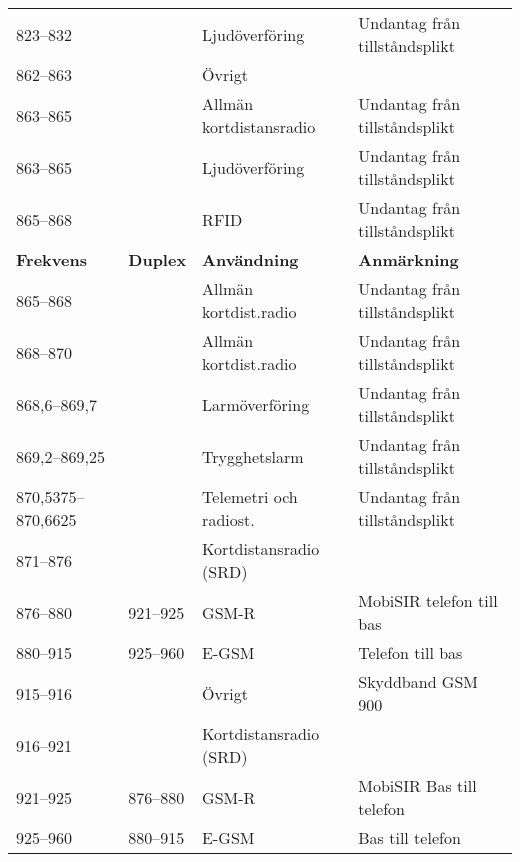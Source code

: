 \begin{landscape}
\begin{longtable}{llll}
	823--832           &                    & Ljudöverföring          & Undantag från tillståndsplikt            \\
	862--863           &                    & Övrigt                  &  \\
	863--865           &                    & Allmän kortdistansradio & Undantag från tillståndsplikt            \\
	863--865           &                    & Ljudöverföring          & Undantag från tillståndsplikt            \\
	865--868           &                    & RFID                    & Undantag från tillståndsplikt            \\
	\textbf{Frekvens}  & \textbf{Duplex}    & \textbf{Användning}     & \textbf{Anmärkning}                      \\ \hline
	865--868           &                    & Allmän kortdist.radio   & Undantag från tillståndsplikt            \\
	868--870           &                    & Allmän kortdist.radio   & Undantag från tillståndsplikt            \\
	868,6--869,7       &                    & Larmöverföring          & Undantag från tillståndsplikt            \\
	869,2--869,25      &                    & Trygghetslarm           & Undantag från tillståndsplikt            \\
	870,5375--870,6625 &                    & Telemetri och radiost.  & Undantag från tillståndsplikt            \\
	871--876           &                    & Kortdistansradio (SRD)  &  \\
	876--880           & 921--925           & GSM-R                   & MobiSIR telefon till bas                 \\
	880--915           & 925--960           & E-GSM                   & Telefon till bas                         \\
	915--916           &                    & Övrigt                  & Skyddband GSM 900                        \\
	916--921           &                    & Kortdistansradio (SRD)  &  \\
	921--925           & 876--880           & GSM-R                   & MobiSIR Bas till telefon                 \\
	925--960           & 880--915           & E-GSM                   & Bas till telefon                         \\

\end{longtable}
\end{landscape}

